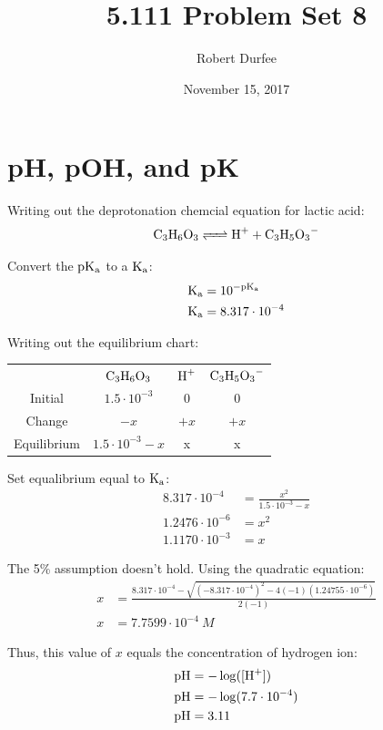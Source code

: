 \documentclass{article}
\title{ 5.111 Problem Set 8 }
\author{ Robert Durfee }
\date{ November 15, 2017 }
\begin{document}
\maketitle

\section{ pH, pOH, and pK }

Writing out the deprotonation chemcial equation for lactic acid:
$$\ce{C_3H_6O_3 <=> H+ + C_3H_5O_3-}$$

Convert the $\rm{pK_a}$ to a $\rm{K_a}$:
\begin{align*}
    \rm{K_a} &= 10^{-\rm{pK_a}} \\
    \rm{K_a} &= 8.317 \cdot 10^{-4}
\end{align*}

Writing out the equilibrium chart:

\begin{center}
    \begin{tabular}{c c c c}
         & $\ce{C_3H_6O_3}$ & $\ce{H+}$ & $\ce{C_3H_5O_3-}$ \\
        Initial & $1.5 \cdot 10^{-3}$ & 0 & 0 \\
        Change & $-x$ & $+x$ & $+x$ \\
        Equilibrium & $1.5 \cdot 10^{-3} - x$ & x & x
    \end{tabular}
\end{center}

Set equalibrium equal to $\rm{K_a}$:
\begin{align*}
    8.317 \cdot 10^{-4} &= \frac{x^2}{1.5 \cdot 10^{-3} - x} \\
    1.2476 \cdot 10^{-6} &= x^2 \\
    1.1170 \cdot 10^{-3} &= x
\end{align*}

The 5\% assumption doesn't hold. Using the quadratic equation:
\begin{align*}
    x &= \frac{8.317 \cdot 10^{-4} - \sqrt{ (-8.317 \cdot 10^{-4} )^2 -
    4(-1)(1.24755 \cdot 10^{-6})}}{2(-1)} \\
    x &= 7.7599 \cdot 10^{-4}\ \si{M}
\end{align*}

Thus, this value of $x$ equals the concentration of hydrogen ion:
\begin{align*}
    \rm{pH} &= -\log([\ce{H+}]) \\
    \rm{pH} &= -\log(7.7 \cdot 10^{-4}) \\
    \rm{pH} &= 3.11
\end{align*}
\end{document}
